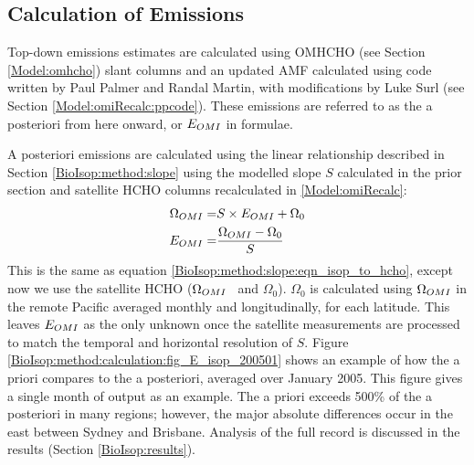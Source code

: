     
  \subsection{Calculation of Emissions}
    \label{BioIsop:method:calculation}
   
    Top-down emissions estimates are calculated using OMHCHO (see Section \ref{Model:omhcho}) slant columns and an updated AMF calculated using code written by Paul Palmer and Randal Martin, with modifications by Luke Surl (see Section \ref{Model:omiRecalc:ppcode}).
    These emissions are referred to as the a posteriori from here onward, or $E_{OMI}$ in formulae.
    
    
    A posteriori emissions are calculated using the linear relationship described in Section \ref{BioIsop:method:slope} using the modelled slope $S$ calculated in the prior section and satellite HCHO columns recalculated in \ref{Model:omiRecalc}:
    \begin{eqnarray} \begin{split}
      \label{BioIsop:method:eqn_Enew}
      \Omega_{OMI} = & S \times E_{OMI} + \Omega_0 \\
      E_{OMI} = & \frac{\Omega_{OMI} - \Omega_{0}}{S}
    \end{split} \end{eqnarray} 
    This is the same as equation \ref{BioIsop:method:slope:eqn_isop_to_hcho}, except now we use the satellite HCHO ($\Omega_{OMI}$ ~and $\Omega_0$).
    $\Omega_0$ is calculated using $\Omega_{OMI}$ in the remote Pacific averaged monthly and longitudinally, for each latitude.
    This leaves $E_{OMI}$ as the only unknown once the satellite measurements are processed to match the temporal and horizontal resolution of $S$.
    Figure \ref{BioIsop:method:calculation:fig_E_isop_200501} shows an example of how the a priori compares to the a posteriori, averaged over January 2005.
    This figure gives a single month of output as an example.
    The a priori exceeds 500\% of the a posteriori in many regions; however, the major absolute differences occur in the east between Sydney and Brisbane. 
    Analysis of the full record is discussed in the results (Section \ref{BioIsop:results}).
    
